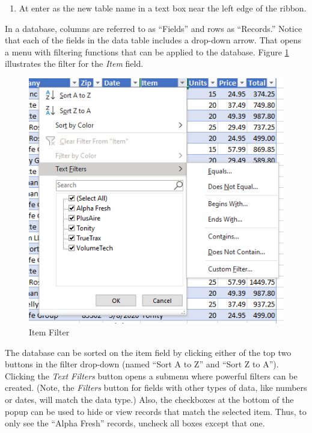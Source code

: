 \begin{enumerate}[resume]
	\item At  enter  as the new table name in a text box near the left edge of the ribbon.
\end{enumerate}

In a database, columns are referred to as ``Fields'' and rows as ``Records.'' Notice that each of the fields in the data table includes a drop-down arrow. That opens a menu with filtering functions that can be applied to the database. Figure \ref{09:fig12} illustrates the filter for the \textit{Item} field.

\begin{figure}[H]
	\centering
	\includegraphics[width=\maxwidth{.95\linewidth}]{gfx/ch09_fig12}
	\caption{Item Filter}
	\label{09:fig12}
\end{figure}

The database can be sorted on the item field by clicking either of the top two buttons in the filter drop-down (named ``Sort A to Z'' and ``Sort Z to A''). Clicking the \textit{Text Filters} button opens a submenu where powerful filters can be created. (Note, the \textit{Filters} button for fields with other types of data, like numbers or dates, will match the data type.) Also, the checkboxes at the bottom of the popup can be used to hide or view records that match the selected item. Thus, to only see the ``Alpha Fresh'' records, uncheck all boxes except that one.

